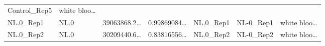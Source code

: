 \documentclass[
]{article}
\begin{document}
\begin{longtable}[]{@{}lllllll@{}}
\begin{minipage}[t]{0.12\columnwidth}
Control\_Rep5\strut
\end{minipage} & \begin{minipage}[t]{0.13\columnwidth}\raggedright
white bloo\ldots{}\strut
\end{minipage}\tabularnewline
\begin{minipage}[t]{0.12\columnwidth}\raggedright
NL.0\_Rep1\strut
\end{minipage} & \begin{minipage}[t]{0.07\columnwidth}\raggedright
NL.0\strut
\end{minipage} & \begin{minipage}[t]{0.13\columnwidth}\raggedright
39063868.2\ldots{}\strut
\end{minipage} & \begin{minipage}[t]{0.13\columnwidth}\raggedright
0.99869084\ldots{}\strut
\end{minipage} & \begin{minipage}[t]{0.12\columnwidth}\raggedright
NL.0\_Rep1\strut
\end{minipage} & \begin{minipage}[t]{0.12\columnwidth}\raggedright
NL-0\_Rep1\strut
\end{minipage} & \begin{minipage}[t]{0.13\columnwidth}\raggedright
white bloo\ldots{}\strut
\end{minipage}\tabularnewline
\begin{minipage}[t]{0.12\columnwidth}\raggedright
NL.0\_Rep2\strut
\end{minipage} & \begin{minipage}[t]{0.07\columnwidth}\raggedright
NL.0\strut
\end{minipage} & \begin{minipage}[t]{0.13\columnwidth}\raggedright
30209440.6\ldots{}\strut
\end{minipage} & \begin{minipage}[t]{0.13\columnwidth}\raggedright
0.83816556\ldots{}\strut
\end{minipage} & \begin{minipage}[t]{0.12\columnwidth}\raggedright
NL.0\_Rep2\strut
\end{minipage} & \begin{minipage}[t]{0.12\columnwidth}\raggedright
NL-0\_Rep2\strut
\end{minipage} & \begin{minipage}[t]{0.13\columnwidth}\raggedright
white bloo\ldots{}\strut
\end{minipage}\tabularnewline

\end{longtable}
\end{document}

